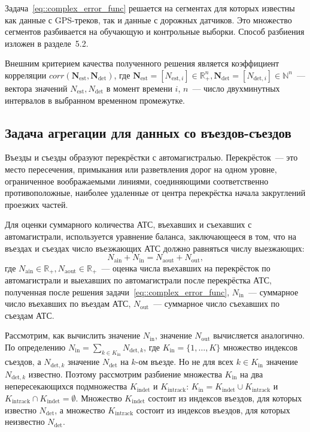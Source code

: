 Задача~\eqref{eq::complex_error_func} решается на сегментах для которых известны как данные с GPS-треков, так и данные с дорожных датчиков. Это множество сегментов разбивается на обучающую и контрольные выборки. Способ разбиения изложен в разделе~5.2.

Внешним критерием качества полученного решения является коэффициент корреляции $corr(\mathbf{N}_\text{est}, \mathbf{N}_\text{det})$, где $\mathbf{N}_\text{est} = [N_{\text{est}, i}] \in \mathbb{R}_{+}^{n}, \mathbf{N}_\text{det} = [N_{\text{det}, i}] \in \mathbb{N}^{n}$~--- вектора значений $N_\text{est}, N_\text{det}$ в момент времени $i$, $n$~--- число двухминутных интервалов в выбранном временном промежутке.

\subsection{Задача агрегации для данных со въездов-съездов}
Въезды и съезды образуют перекрёстки с автомагистралью.
Перекрёсток~--- это место пересечения, примыкания или разветвления дорог на одном уровне, ограниченное воображаемыми линиями, соединяющими соответственно противоположные, наиболее удаленные от центра перекрёстка начала закруглений проезжих частей.

Для оценки суммарного количества АТС, въехавших и съехавших с автомагистрали, используется уравнение баланса, заключающееся в том, что на въездах и съездах число въезжающих АТС должно равняться числу выезжающих:
\begin{equation}
    N_\text{ain} + N_\text{in} = N_\text{aout} + N_\text{out},
    \label{eq::balance_eq}
\end{equation}
где $N_\text{ain} \in \mathbb{R}_{+}, N_\text{aout} \in \mathbb{R}_{+}$~--- оценка числа въехавших на перекрёсток по автомагистрали и выехавших по автомагистрали после перекрёстка АТС, полученная после решения задачи~\eqref{eq::complex_error_func}, $N_\text{in}$~--- суммарное число въехавших по въездам АТС, $N_\text{out}$~--- суммарное число съехавших по съездам АТС.

Рассмотрим, как вычислить значение $N_\text{in}$, значение $N_\text{out}$ вычисляется аналогично.
По определению $N_\text{in} = \sum\limits_{k\in K_\text{in}} N_{\text{det}, k}$, где $K_\text{in} = \{1, \ldots, K\}$ множество индексов съездов, а $N_{\text{det}, k}$ значение $N_\text{det}$ на $k$-ом въезде.
Но не для всех $k\in K_\text{in}$ значение $N_{\text{det}, k}$ известно.
Поэтому рассмотрим разбиение множества $K_\text{in}$ на два непересекающихся подмножества $K_\text{indet}$ и $K_\text{intrack}$: $K_\text{in} = K_\text{indet} \cup K_\text{intrack}$ и $K_\text{intrack} \cap K_\text{indet} = \emptyset$.
Множество $K_\text{indet}$ состоит из индексов въездов, для которых известно $N_\text{det}$, а множество $K_\text{intrack}$ состоит из индексов въездов, для которых неизвестно $N_\text{det}$.

